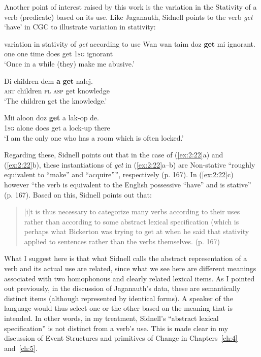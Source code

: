 Another point of interest raised by this work is the variation in the
Stativity of a verb (predicate) based on its use.  Like Jaganauth,
Sidnell points to the verb \textit{get} `have' in CGC to illustrate
variation in stativity:

\ea%
\label{ex:2:22}

\citet[167]{Sidnell2002} variation in stativity of \textit{get}
according to use \ea
\gll Wan wan taim  doz \textbf{get} mi ignorant.\\
		one one time does get \textsc{1sg} ignorant\\
\glt `Once in a while (they) make me abusive.'

\ex
\gll Di children    dem \textbf{a}      \textbf{get} nalej.\\
\textsc{art} children \textsc{pl} \textsc{asp} get knowledge\\
\glt `The children get the knowledge.'

\ex
\gll Mii aloon doz \textbf{get} a lak-op de.\\
\textsc{1sg} alone does get a lock-up there \\
\glt `I am the only one who has a room which is often locked.' \z \z

Regarding these, Sidnell points out that in the case of
(\ref{ex:2:22}a) and (\ref{ex:2:22}b), these instantiations of
\textit{get} in (\ref{ex:2:22}a--b) are Non-stative “roughly equivalent
to “make” and “acquire””, respectively (p. 167).  In (\ref{ex:2:22}c)
however “the verb is equivalent to the English possessive “have” and
is stative” (p. 167). Based on this, Sidnell points out that:

\begin{quote}
[i]t is thus necessary to categorize many verbs according to their
uses rather than according to some abstract lexical specification
(which is perhaps what Bickerton was trying to get at when he said
that stativity applied to sentences rather than the verbs themselves.
(p. 167)
\end{quote}

What I suggest here is that what Sidnell calls the abstract
representation of a verb and its actual use are related, since what we see
here are different meanings associated with two homophonous and
clearly related lexical items.  As I pointed out previously, in the
discussion of Jaganauth’s data, these are semantically distinct items
(although represented by identical forms).  A speaker of the language
would thus select one or the other based on the meaning that is
intended. In other words, in my treatment, Sidnell’s “abstract lexical
specification” is not distinct from a verb’s use.  This is made clear
in my discussion of Event Structures and primitives of Change in
Chapters~\ref{ch:4} and~\ref{ch:5}.

